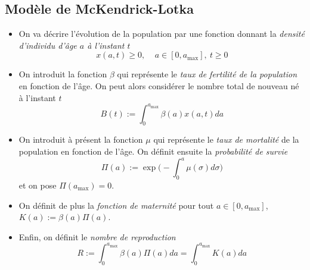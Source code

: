 \subsection{Modèle de McKendrick-Lotka}
\begin{frame}
    \begin{itemize}
        \item On va décrire l'évolution de la population par une fonction donnant la \textcolor{astral}{\textit{densité d'individu d'âge $a$ à l'instant $t$}}
        \begin{equation*}
            x(a,t) \geq 0, \ \ \ \ \ a \in [0,a_{\max}], \ t \geq 0
        \end{equation*}
        \pause
        \item On introduit la fonction $\beta$ qui représente le \textcolor{astral}{\textit{taux de fertilité de la population}} en fonction de l'âge. On peut alors considérer le nombre total de nouveau né à l'instant $t$
        \begin{equation*}
            B(t):= \int_{0}^{a_{\max}}\beta(a)x(a,t)d a
        \end{equation*} \pause
        \item On introduit à présent la fonction $\mu$ qui représente le \textcolor{astral}{\textit{taux de mortalité}} de la population en fonction de l'âge. On définit ensuite la \textcolor{astral}{\textit{probabilité de survie}}
        \begin{equation*}
            \Pi (a) := \exp\bigg(-\int_{0}^a \mu(\sigma)d \sigma\bigg)
        \end{equation*}
        et on pose $\Pi(a_{\max}) = 0$. \pause
        \item On définit de plus la \textcolor{astral}{\textit{fonction de maternité}} pour tout $a \in [0,a_{\max}]$, $K(a) := \beta(a)\Pi(a)$. \pause 
        \item Enfin, on définit le \textcolor{astral}{\textit{nombre de reproduction}}
        \begin{equation*}
            R := \int_0^{a_{\max}} \beta(a)\Pi(a)d a = \int_0^{a_{\max}} K(a)d a
        \end{equation*}
    \end{itemize}
\end{frame}


